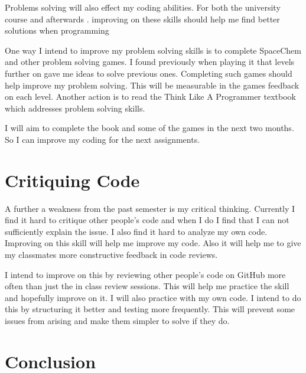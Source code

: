 \documentclass{scrartcl}
\begin{document}
Problems solving will also effect my coding abilities. For both the university course and afterwards . improving on these skills should help me find better solutions when programming

One way I intend to improve my problem solving skills is to complete  SpaceChem and other problem solving games. I found previously when playing it that levels further on gave me ideas to solve previous ones. Completing such games should help improve my problem solving.  This will be measurable in the games feedback on each level. Another action is to read the Think Like A Programmer textbook which addresses problem solving skills.

I will aim to complete the book and some of the games in the next two months. So I can improve my coding for the next assignments. 
	
	\section{Critiquing Code}
A further a weakness from the past semester is my critical thinking. Currently I find it hard to critique other people's code and when I do I find that I can not sufficiently explain the  issue. I also find it hard to analyze my own code. Improving on this skill will help me improve my code. Also it will help me to give my classmates more constructive feedback in code reviews.

I intend to improve on this by  reviewing other people's code on GitHub more often than just the in class review sessions.  This will help me practice the skill and hopefully improve on it. I will also practice with my own code. I intend to do this by structuring it better and testing more frequently. This will prevent some issues from arising and make them simpler to solve if they do.
	
	\section{Conclusion}
	
	
	
	
\end{document}

